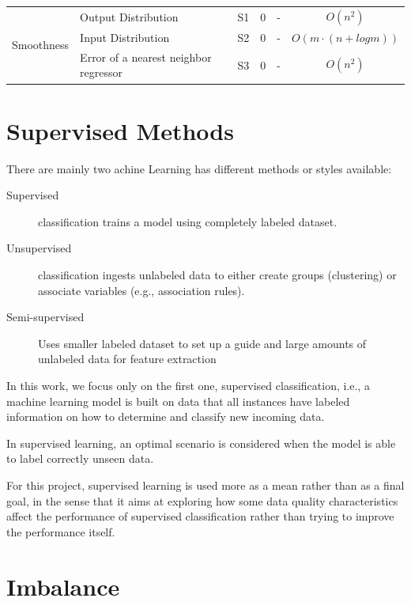 \begin{center}
\begin{scriptsize}
\begin{longtable}{ | r | l | l | c | c | c | }
\multirow{3}{*}{Smoothness} & Output Distribution & 
S1 & 0 & - & $O(n^2)$ \\
\cline{2-6}
& Input Distribution &
S2 & 0 & - & $O(m \cdot (n + log m))$ \\
\cline{2-6}
& Error of a nearest neighbor regressor &
S3 & 0 & - & $O(n^2)$ \\
\hline

\end{longtable}
\end{scriptsize}
\end{center}

\section{Supervised Methods}

There are mainly two achine Learning has different methods or styles available:

\begin{description}
    \item [Supervised] classification trains a model using completely labeled 
	dataset.
    \item [Unsupervised] classification ingests unlabeled data to either create 
	groups (clustering) or associate variables (e.g., association rules).
    \item [Semi-supervised] Uses smaller labeled dataset to set up a guide and 
    large amounts of unlabeled data for feature extraction
\end{description}

In this work, we focus only on the first one, supervised classification, i.e., a
machine learning model is built on data that all instances have labeled 
information on how to determine and classify new incoming data.

In supervised learning, an optimal scenario is considered when the model is able
to label correctly unseen data. 

For this project, supervised learning is used more as a mean rather than as a 
final goal, in the sense that it aims at exploring how some data quality 
characteristics affect the performance of supervised classification rather than 
trying to improve the performance itself. 

\section{Imbalance}
\label{sec:imbtechniques}

